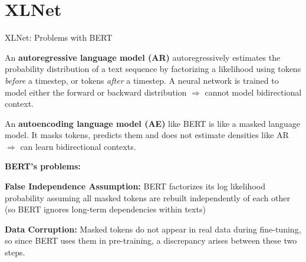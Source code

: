 

\section{XLNet}


\begin{frame}{XLNet: Problems with BERT}

\begin{itemizeSpaced}{7pt}
    \pinkbox An \textbf{autoregressive language model (AR)} autoregressively estimates the probability distribution of a text sequence by factorizing a likelihood using tokens \emph{before} a timestep, or tokens \emph{after} a timestep. A neural network is trained to model either the forward or backward distribution $\Rightarrow$ cannot model bidirectional context. 
    
    \item An \textbf{autoencoding language model (AE)} like BERT is like a masked language model. It masks tokens, predicts them and does not estimate densities like AR $\Rightarrow$ can learn bidirectional contexts. 
    
    \pinkbox \textbf{BERT's problems: }
    \begin{itemizeSpaced}{7pt}
        
        \item \textbf{False Independence Assumption: } BERT factorizes its log likelihood probability assuming all masked tokens are rebuilt independently of each other (so BERT ignores long-term dependencies within texts)
        
        \item \textbf{Data Corruption: }Masked tokens do not appear in real data during fine-tuning, so since BERT uses them in pre-training, a discrepancy arises between these two steps. 
    \end{itemizeSpaced}
    
    
\end{itemizeSpaced}


    
\end{frame}


